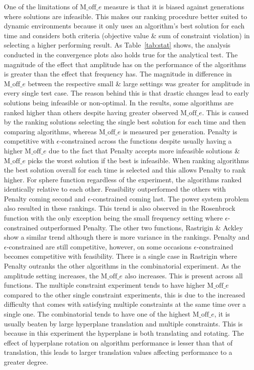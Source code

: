 \documentclass[review]{elsarticle}
\begin{document}
One of the limitations of $\text{M\_off}\_e$ measure is that it is biased against generations where solutions are infeasible. This makes our ranking procedure better suited to dynamic environments because it only uses an algorithm's best solution for each time and considers both criteria (objective value \& sum of constraint violation) in selecting a higher performing result.
As Table~\ref{tab:stat} shows, the analysis conducted in the convergence plots also holds true for the analytical test.
The magnitude of the effect that amplitude has on the performance of the algorithms is greater than the effect that frequency has. The magnitude in difference in $\text{M\_off}\_e$ between the respective small \& large settings was greater for amplitude in every single test case. The reason behind this is that drastic changes lead to early solutions being infeasible or non-optimal.
In the results, some algorithms are ranked higher than others despite having greater observed $\text{M\_off}\_e$. This is caused by the ranking solutions selecting the single best solution for each time and then comparing algorithms, whereas $\text{M\_off}\_e$ is measured per generation. Penalty is competitive with $\epsilon$-constrained across the functions despite usually having a higher $\text{M\_off}\_e$ due to the fact that Penalty accepts more infeasible solutions \& $\text{M\_off}\_e$ picks the worst solution if the best is infeasible. When ranking algorithms the best solution overall for each time is selected and this allows Penalty to rank higher.
For sphere function regardless of the experiment, the algorithms ranked identically relative to each other. Feasibility outperformed the others with Penalty coming second and $\epsilon$-constrained coming last. The power system problem also resulted in these rankings. This trend is also observed in the Rosenbrock function with the only exception being the small frequency setting where $\epsilon$-constrained outperformed Penalty. The other two functions, Rastrigin \& Ackley show a similar trend although there is more variance in the rankings. Penalty and $\epsilon$-constrained are still competitive, however, on some occasions $\epsilon$-constrained becomes competitive with feasibility. There is a single case in Rastrigin where Penalty outranks the other algorithms in the combinatorial experiment.
As the amplitude setting increases, the $\text{M\_off}\_e$ also increases. This is present across all functions. The multiple constraint experiment tends to have higher $\text{M\_off}\_e$ compared to the other single constraint experiments, this is due to the increased difficulty that comes with satisfying multiple constraints at the same time over a single one. The combinatorial tends to have one of the highest $\text{M\_off}\_e$, it is usually beaten by large hyperplane translation and multiple constraints. This is because in this experiment the hyperplane is both translating and rotating. The effect of hyperplane rotation on algorithm performance is lesser than that of translation, this leads to larger translation values affecting performance to a greater degree.
\end{document}
